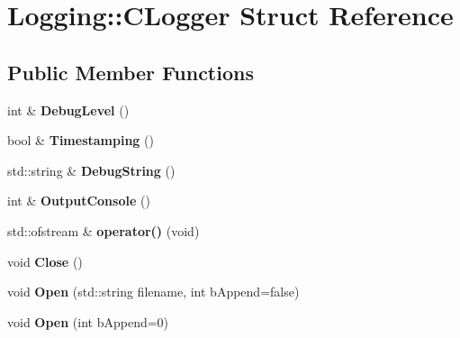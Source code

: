\hypertarget{struct_logging_1_1_c_logger}{}\section{Logging\+:\+:C\+Logger Struct Reference}
\label{struct_logging_1_1_c_logger}
\subsection*{Public Member Functions}
\begin{DoxyCompactItemize}
\item 
\hypertarget{struct_logging_1_1_c_logger_a4d26b49ac9018acbd07c257f634fe515}{}int \& {\bfseries Debug\+Level} ()\label{struct_logging_1_1_c_logger_a4d26b49ac9018acbd07c257f634fe515}

\item 
\hypertarget{struct_logging_1_1_c_logger_ab1aa58d025e099bd24bfd5a1d093f092}{}bool \& {\bfseries Timestamping} ()\label{struct_logging_1_1_c_logger_ab1aa58d025e099bd24bfd5a1d093f092}

\item 
\hypertarget{struct_logging_1_1_c_logger_ac07ce3cc0b1eb6266b7d2ca1536ee741}{}std\+::string \& {\bfseries Debug\+String} ()\label{struct_logging_1_1_c_logger_ac07ce3cc0b1eb6266b7d2ca1536ee741}

\item 
\hypertarget{struct_logging_1_1_c_logger_a2d3c12d0f7c9790eddc7efc9fe8d82c3}{}int \& {\bfseries Output\+Console} ()\label{struct_logging_1_1_c_logger_a2d3c12d0f7c9790eddc7efc9fe8d82c3}

\item 
\hypertarget{struct_logging_1_1_c_logger_aca4b48a0215731bd596673f919942c20}{}std\+::ofstream \& {\bfseries operator()} (void)\label{struct_logging_1_1_c_logger_aca4b48a0215731bd596673f919942c20}

\item 
\hypertarget{struct_logging_1_1_c_logger_ae7d35f75b131a06873cb5e461f1f4b4b}{}void {\bfseries Close} ()\label{struct_logging_1_1_c_logger_ae7d35f75b131a06873cb5e461f1f4b4b}

\item 
\hypertarget{struct_logging_1_1_c_logger_af70865f429e2ba89331bd33dd39356be}{}void {\bfseries Open} (std\+::string filename, int b\+Append=false)\label{struct_logging_1_1_c_logger_af70865f429e2ba89331bd33dd39356be}

\item 
\hypertarget{struct_logging_1_1_c_logger_a9fe8b3b0e47f81003c484f309b724d05}{}void {\bfseries Open} (int b\+Append=0)\label{struct_logging_1_1_c_logger_a9fe8b3b0e47f81003c484f309b724d05}


\end{DoxyCompactItemize}
